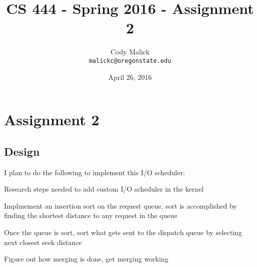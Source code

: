 \documentclass[10pt,letterpaper]{article}
\begin{document}
\begin{titlepage}
  \title{CS 444 - Spring 2016 - Assignment 2}
  \author{Cody Malick\\
  \texttt{malickc@oregonstate.edu}}
  \date{April 26, 2016}
  \maketitle
  \vspace*{2cm}
  \begin{abstract}
      \noindent   \end{abstract}

\end{titlepage}

\tableofcontents
\clearpage

\section{Assignment 2}
  \subsection{Design}
I plan to do the following to implement this I/O scheduler:
\begin{description}
	\item Research steps needed to add custom I/O scheduler in the kernel
	\item Implmement an insertion sort on the request queue, sort is accomplished by finding the shortest distance to any request in the queue
	\item Once the queue is sort, sort what gets sent to the dispatch queue by selecting next closest seek distance
	\item Figure out how merging is done, get merging working

\end{description}
\end{document}
